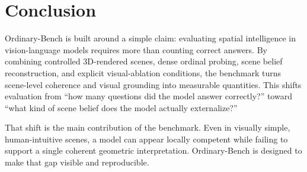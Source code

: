 \section{Conclusion}
\label{sec:conclusion}

Ordinary-Bench is built around a simple claim: evaluating spatial intelligence in vision-language models requires more than counting correct answers. By combining controlled 3D-rendered scenes, dense ordinal probing, scene belief reconstruction, and explicit visual-ablation conditions, the benchmark turns scene-level coherence and visual grounding into measurable quantities. This shifts evaluation from ``how many questions did the model answer correctly?'' toward ``what kind of scene belief does the model actually externalize?''

That shift is the main contribution of the benchmark. Even in visually simple, human-intuitive scenes, a model can appear locally competent while failing to support a single coherent geometric interpretation. Ordinary-Bench is designed to make that gap visible and reproducible.
